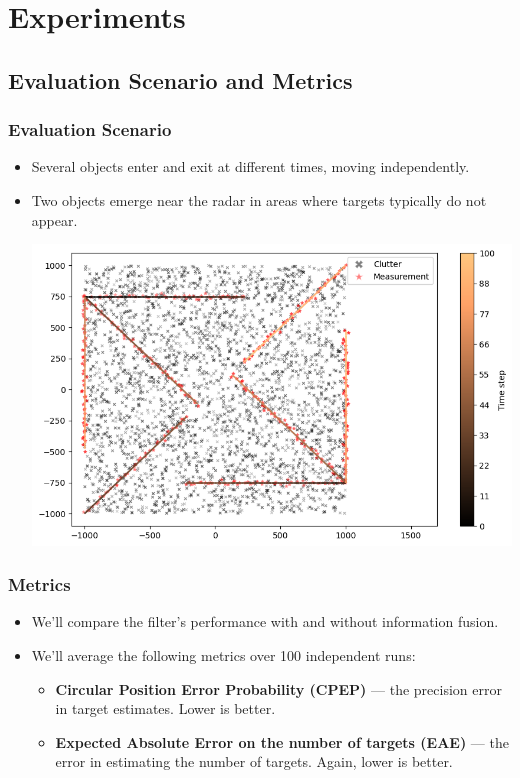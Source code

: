 \section{Experiments}

\subsection*{Evaluation Scenario and Metrics}\begin{frame}\frametitle{Evaluation Scenario}
    \begin{itemize}
        \item Several objects enter and exit at different times, moving independently.
        \item Two objects emerge near the radar in areas where targets typically do not appear.

        \begin{center}
            \vspace*{3mm}
            \includegraphics[width=0.6\linewidth]{pic/experiment-true.png}
        \end{center}
    \end{itemize}
\end{frame}

\begin{frame}\frametitle{Metrics}
    \begin{itemize}
        \item We'll compare the filter's performance with and without information fusion.
        \item We'll average the following metrics over 100 independent runs:
        \begin{itemize}
            \item \textbf{Circular Position Error Probability (CPEP)} — the precision error in target estimates. Lower is better.
            \item \textbf{Expected Absolute Error on the number of targets (EAE)} — the error in estimating the number of targets. Again, lower is better.
        \end{itemize}
    \end{itemize}
\end{frame}

